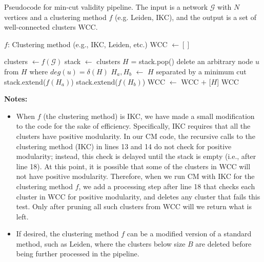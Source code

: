 \documentclass[a4paper]{article}   	%
\begin{document}
\clearpage
\begin{algorithm}[h]
\caption{Pseudocode for min-cut validity pipeline. The input is a network $\mathcal{G}$ with $N$ vertices and a clustering method $f$ (e.g. Leiden, IKC), and the output is a set of well-connected clusters WCC.}
\begin{algorithmic}[2]
\State $f$: Clustering method (e.g., IKC, Leiden, etc.)
\State WCC $\gets []$ 

\State clusters $\gets f(\mathcal{G})$ 
\State stack $\gets$ clusters
 
    \State $H$ = stack.pop()
    \State delete an arbitrary node $u$ from $H$ where $deg(u) = \delta(H)$
    \EndWhile
     
        \State $H_a, H_b$ $\gets$ $H$ separated by a minimum cut
        \State stack.extend($f(H_a)$) 
        \State stack.extend($f(H_b)$)  
    \Else
            \State WCC $\gets$ WCC $+$ [$H$] 
        \EndIf
\EndWhile
\State \Return WCC 
\EndFunction
\end{algorithmic}

\label{alg:full-pipeline}
\end{algorithm}

\textbf{Notes:} 
\begin{itemize}
\item When
$f$ (the clustering method) is IKC, we have made a small modification to the
code for the sake of efficiency.
Specifically, IKC requires that all the clusters have positive modularity.
 In our CM code, the recursive
calls to the clustering method (IKC) in lines 13 and 14 do not check for positive modularity; instead, this check is delayed until the stack is empty (i.e., after line 18).
At this point, it is possible that some of the clusters in WCC will not have positive modularity.
Therefore, when we run CM with IKC for the clustering method $f$,  we add a processing step after line 18 that checks each cluster in WCC for positive modularity,
and deletes any cluster that fails this test.
Only after pruning all such clusters from WCC will we return what is left.
\item If desired, the clustering method $f$ can be a modified version of a standard method, such as Leiden, where the clusters below size $B$ are deleted before being further processed in the pipeline. 
\end{itemize}
\end{document}
